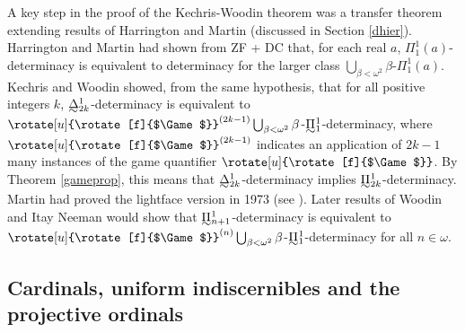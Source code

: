 \documentclass{book}%
\newcommand{\game}{\rotate[u]{\rotate[f]{$\Game$}}}
\def\underTilde#1{{\baselineskip=0pt\vtop{\hbox{$#1$}\hbox{$\sim$}}}{}}
\newcommand{\uTPi}{\underTilde{\Pi}}
\newcommand{\uTDelta}{\underTilde{\Delta}}
\begin{document}
A key step in the proof of the Kechris-Woodin theorem was
a transfer theorem extending results of Harrington and
Martin
(discussed in Section \ref{dhier}). Harrington and Martin had shown from ZF + DC that,
for each real $a$, $\Pi^{1}_{1}(a)$-determinacy is equivalent to determinacy for the larger class $\bigcup_{\beta < \omega^{2}} \beta$-$\Pi^{1}_{1}(a)$.
Kechris and Woodin showed, from the same hypothesis, that for all positive integers $k$, $\uTDelta^{1}_{2k}$-determinacy
is equivalent to $\game^{(2k-1)}\bigcup_{\beta < \omega^{2}} \beta$-$\uTPi^{1}_{1}$-determinacy, where $\game^{(2k-1)}$ indicates
an application of $2k-1$ many instances of the game quantifier $\game$. By Theorem \ref{gameprop}, this means that
$\uTDelta^{1}_{2k}$-determinacy implies $\uTPi^{1}_{2k}$-determinacy. Martin had proved the lightface version in 1973 (see \cite{KechrisSolovay:1985}).
Later results of Woodin and Itay Neeman 
would show that $\uTPi^{1}_{n+1}$-determinacy is equivalent to $\game^{(n)}\bigcup_{\beta < \omega^{2}} \beta$-$\uTPi^{1}_{1}$-determinacy
for all $n \in \omega$.



\subsection{Cardinals, uniform indiscernibles and the projective ordinals}\label{projo}

\end{document}
